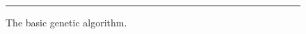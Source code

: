 \begin{figure}[htbp]
\begin{center}
\begin{varwidth}{\textwidth}
\end{varwidth}
\end{center}
\centering
\rule{35em}{0.5pt}
\caption[Basic GA]{The basic genetic algorithm.}
\label{fig:ga}
\end{figure}

